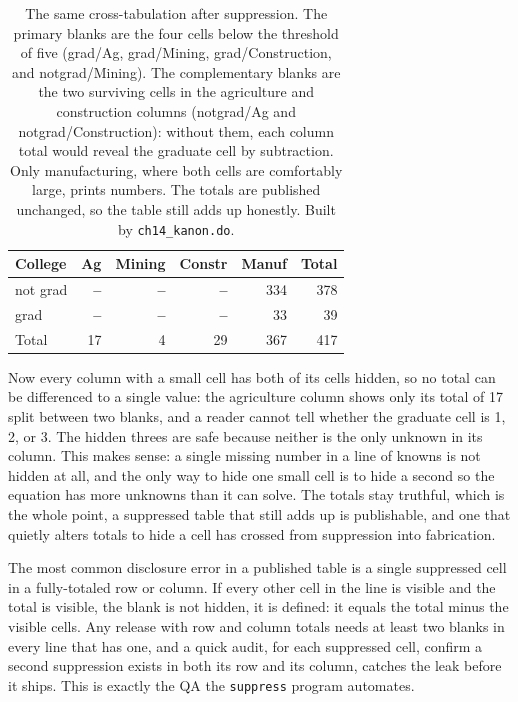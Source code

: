 \documentclass[
    a4paper,
    fontsize=10pt,
    twoside=true,
    numbers=noenddot,
]{kaobook}
\newenvironment{vizcallout}[1][Visualization to build]{%
    \begin{vizbox}[frametitle={#1}]%
}{%
    \end{vizbox}%
}
\begin{document}
\begin{table}[htbp]
\centering
{\footnotesize
\begin{tabular}{lrrrrr}
\hline
College   & Ag & Mining & Constr & Manuf & Total \\
\hline
not grad  & \textbf{--} & \textbf{--} & \textbf{--} & 334 & 378 \\
grad      & \textbf{--} & \textbf{--} & \textbf{--} &  33 &  39 \\
\hline
Total     & 17 &  4 & 29 & 367 & 417 \\
\hline
\end{tabular}
}
\caption[Primary and complementary suppression]{The same cross-tabulation after suppression. The primary blanks are the four cells below the threshold of five (grad/Ag, grad/Mining, grad/Construction, and notgrad/Mining). The complementary blanks are the two surviving cells in the agriculture and construction columns (notgrad/Ag and notgrad/Construction): without them, each column total would reveal the graduate cell by subtraction. Only manufacturing, where both cells are comfortably large, prints numbers. The totals are published unchanged, so the table still adds up honestly. Built by \texttt{ch14\_kanon.do}.}
\label{tab:suppress}
\end{table}

Now every column with a small cell has both of its cells hidden, so no total can be differenced to a single value: the agriculture column shows only its total of 17 split between two blanks, and a reader cannot tell whether the graduate cell is 1, 2, or 3. The hidden threes are safe because neither is the only unknown in its column. This makes sense: a single missing number in a line of knowns is not hidden at all, and the only way to hide one small cell is to hide a second so the equation has more unknowns than it can solve. The totals stay truthful, which is the whole point, a suppressed table that still adds up is publishable, and one that quietly alters totals to hide a cell has crossed from suppression into fabrication.

\begin{vizcallout}[Suppression that leaks: the single-blank trap]
The most common disclosure error in a published table is a single suppressed cell in a fully-totaled row or column. If every other cell in the line is visible and the total is visible, the blank is not hidden, it is defined: it equals the total minus the visible cells. Any release with row and column totals needs at least two blanks in every line that has one, and a quick audit, for each suppressed cell, confirm a second suppression exists in both its row and its column, catches the leak before it ships. This is exactly the QA the \texttt{suppress} program automates.
\end{vizcallout}
\end{document}
